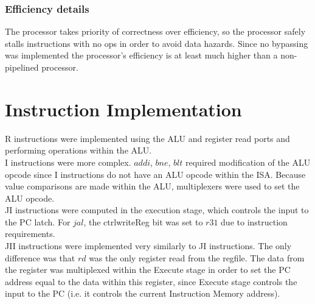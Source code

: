 \documentclass[a4paper,11pt]{article}
\begin{document}
\subsubsection*{Efficiency details}
The processor takes priority of correctness over efficiency, so the processor safely stalls instructions with no ops in order to avoid data hazards. Since no bypassing was implemented the processor's efficiency is at least much higher than a non-pipelined processor.

\newpage

\section{Instruction Implementation}

R instructions were implemented using the ALU and register read ports and performing operations within the ALU. \\

I instructions were more complex. $addi$, $bne$, $blt$ required modification of the ALU opcode since I instructions do not have an ALU opcode within the ISA. Because value comparisons are made within the ALU, multiplexers were used to set the ALU opcode.\\

JI instructions were computed in the execution stage, which controls the input to the PC latch. For $jal$, the ctrlwriteReg bit was set to $r31$ due to instruction requirements.\\

JII instructions were implemented very similarly to JI instructions. The only difference was that $rd$ was the only register read from the regfile. The data from the register was multiplexed within the Execute stage in order to set the PC address equal to the data within this register, since Execute stage controls the input to the PC (i.e. it controls the current Instruction Memory address). \\
\end{document}
